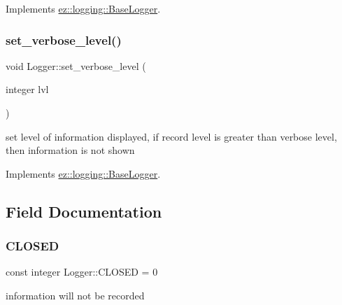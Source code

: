 Implements \hyperlink{classez_1_1logging_1_1BaseLogger_a508a25672c704ec73260978b7f17dd13}{ez\+::logging\+::\+Base\+Logger}.

\mbox{\label{classez_1_1logging_1_1Logger_ae9fd25392d4dc7611acafd335bfe5f94}} 
\subsubsection{\texorpdfstring{set\+\_\+verbose\+\_\+level()}{set\_verbose\_level()}}
{\footnotesize\ttfamily void Logger\+::set\+\_\+verbose\+\_\+level (\begin{DoxyParamCaption}\item[{integer}]{lvl }\end{DoxyParamCaption})\hspace{0.3cm}{\ttfamily [virtual]}}

set level of information displayed, if record level is greater than verbose level, then information is not shown 

Implements \hyperlink{classez_1_1logging_1_1BaseLogger_a2b9ecfbaff4e53d15b3b8bedd53ea2f8}{ez\+::logging\+::\+Base\+Logger}.



\subsection{Field Documentation}
\mbox{\label{classez_1_1logging_1_1Logger_aa9ff03b52cf6bdc21b9e67086510d186}} 
\subsubsection{\texorpdfstring{C\+L\+O\+S\+ED}{CLOSED}}
{\footnotesize\ttfamily const integer Logger\+::\+C\+L\+O\+S\+ED = 0\hspace{0.3cm}{\ttfamily [static]}}

information will not be recorded \mbox{\label{classez_1_1logging_1_1Logger_a016718b598e4266d37ca95254945f4ba}} 
